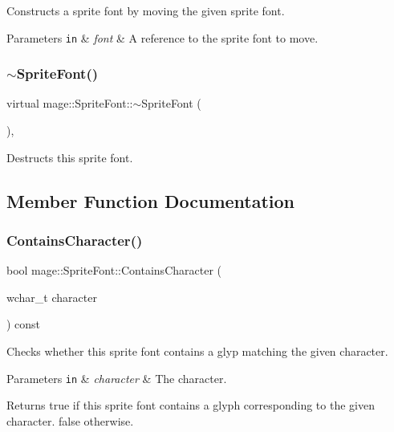 Constructs a sprite font by moving the given sprite font.


\begin{DoxyParams}[1]{Parameters}
\mbox{\tt in}  & {\em font} & A reference to the sprite font to move. \\
\hline
\end{DoxyParams}
\hypertarget{classmage_1_1_sprite_font_a76c98e19f7fccb59d55e1995cfc2356a}{}\label{classmage_1_1_sprite_font_a76c98e19f7fccb59d55e1995cfc2356a} 
\subsubsection{\texorpdfstring{$\sim$\+Sprite\+Font()}{~SpriteFont()}}
{\footnotesize\ttfamily virtual mage\+::\+Sprite\+Font\+::$\sim$\+Sprite\+Font (\begin{DoxyParamCaption}{ }\end{DoxyParamCaption})\hspace{0.3cm}{\ttfamily [virtual]}, {\ttfamily [default]}}

Destructs this sprite font. 

\subsection{Member Function Documentation}
\hypertarget{classmage_1_1_sprite_font_a01836c4197661dbdd66c624d8dc6a7c3}{}\label{classmage_1_1_sprite_font_a01836c4197661dbdd66c624d8dc6a7c3} 
\subsubsection{\texorpdfstring{Contains\+Character()}{ContainsCharacter()}}
{\footnotesize\ttfamily bool mage\+::\+Sprite\+Font\+::\+Contains\+Character (\begin{DoxyParamCaption}\item[{wchar\+\_\+t}]{character }\end{DoxyParamCaption}) const}

Checks whether this sprite font contains a glyp matching the given character.


\begin{DoxyParams}[1]{Parameters}
\mbox{\tt in}  & {\em character} & The character. \\
\hline
\end{DoxyParams}
\begin{DoxyReturn}{Returns}
{\ttfamily true} if this sprite font contains a glyph corresponding to the given character. {\ttfamily false} otherwise. 
\end{DoxyReturn}
\hypertarget{classmage_1_1_sprite_font_aafbc3398a564f7f521af0be2b4deedc1}{}\label{classmage_1_1_sprite_font_aafbc3398a564f7f521af0be2b4deedc1} 
